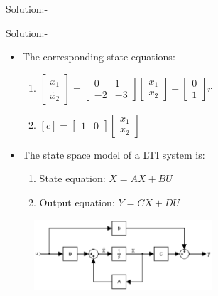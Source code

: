 \documentclass[journal,12pt,twocolumn]{IEEEtran}
\begin{document}
\begin{frame}{Solution:- }
\begin{frame}{Solution:- }
\begin{itemize}
    \item The corresponding state equations:\vspace{5}
    \begin{enumerate}
        \item $\begin{bmatrix}
\dot{x_1}\\
\dot{x_2}
\end{bmatrix} = \begin{bmatrix}
0 & 1\\
-2 & -3
\end{bmatrix} \begin{bmatrix}
x_1\\
x_2
\end{bmatrix} + \begin{bmatrix}
0\\
1
\end{bmatrix}r$
        \item $ [c] = \begin{bmatrix}
1 & 0
\end{bmatrix}\begin{bmatrix}
x_1\\
x_2
\end{bmatrix}$
    \end{enumerate}
    \item The state space model of a LTI system is:
    \begin{enumerate}
        \item State equation: $\dot{X} = AX + BU$
        \item Output equation: $Y = CX + DU$ 
    \end{enumerate}
\end{itemize}
\begin{figure}[h]
\includegraphics[width=250]{./figs/ssm.eps}
\end{figure}
\end{frame}


\end{frame}
\end{document}
